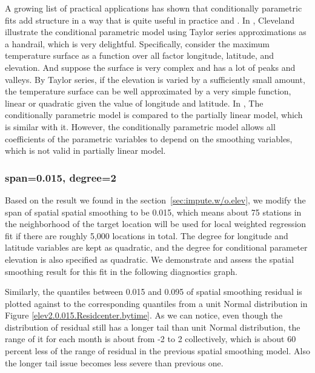 A growing list of practical applications has shown that conditionally parametric
fits add structure in a way that is quite useful in practice 
\cite{cleveland1991computational} and \cite{hastie1990generalized}. In 
\cite{cleveland1994coplots}, Cleveland illustrate the conditional parametric model
using Taylor series approximations as a handrail, which is very delightful.
Specifically, consider the maximum temperature surface as a function over all 
factor longitude, latitude, and elevation. And suppose the surface is very complex
and has a lot of peaks and valleys. By Taylor series, if the elevation is varied 
by a sufficiently small amount, the temperature surface can be well approximated
by a very simple function, linear or quadratic given the value of longitude and
latitude. In \cite{cleveland1992local}, The conditionally parametric model is 
compared to the partially linear model, which is similar with it. However, the 
conditionally parametric model allows all coefficients of the parametric variables 
to depend on the smoothing variables, which is not valid in partially linear
model. 

\subsubsection{span=0.015, degree=2}

Based on the result we found in the section~\ref{sec:impute.w/o.elev}, we modify 
the span of spatial spatial smoothing to be 0.015, which means about 75 stations 
in the neighborhood of the target location will be used for local weighted 
regression fit if there are roughly 5,000 locations in total. The degree for 
longitude and latitude variables are kept as quadratic, and the degree for 
conditional parameter elevation is also specified as quadratic. We demonstrate 
and assess the spatial smoothing result for this fit in the following diagnostics 
graph.

Similarly, the quantiles between 0.015 and 0.095 of spatial smoothing residual is 
plotted against to the corresponding quantiles from a unit Normal distribution in 
Figure
\href{../plots/a1950/spaimpute/elev/d2/span0.015/a1950.spaResidcenter.bytime.pdf}
{\ref*{elev2.0.015.Residcenter.bytime}}. As we can notice, even though the 
distribution of residual still has a longer tail than unit Normal distribution,
the range of it for each month is about from -2 to 2 collectively, which is about 
60 percent less of the range of residual in the previous spatial smoothing model. 
Also the longer tail issue becomes less severe than previous one.

